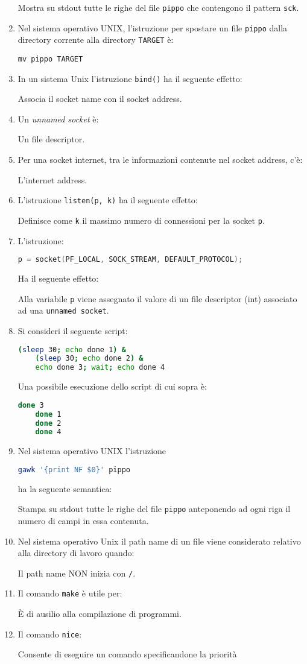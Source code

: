 \documentclass[a4paper,twoside]{article}
\newcommand{\code}[1]{\texttt{#1}}
\begin{document}
\begin{enumerate}
    Mostra su stdout tutte le righe del file \code{pippo} che contengono il pattern \code{sck}.
    \item Nel sistema operativo UNIX, l'istruzione per spostare un file \code{pippo} dalla directory corrente alla directory \code{TARGET} \`e:

    \code{mv pippo TARGET}
    \item In un sistema Unix l'istruzione \code{bind()} ha il seguente effetto:

    Associa il socket name con il socket address.
    \item Un \emph{unnamed socket} \`e:

    Un file descriptor.
    \item Per una socket internet, tra le informazioni contenute nel socket address, c'\`e:

    L'internet address.
    \item L'istruzione \code{listen(p, k)} ha il seguente effetto:

    Definisce come \code{k} il massimo numero di connessioni per la socket \code{p}.
    \item L'istruzione:
    \begin{lstlisting}[language=C]
    p = socket(PF_LOCAL, SOCK_STREAM, DEFAULT_PROTOCOL);
    \end{lstlisting}
    Ha il seguente effetto:

    Alla variabile \code{p} viene assegnato il valore di un file descriptor (int) associato ad una \code{unnamed socket}.
    \item Si consideri il seguente script:
    \begin{lstlisting}[language=sh]
    (sleep 30; echo done 1) &
    (sleep 30; echo done 2) &
    echo done 3; wait; echo done 4
    \end{lstlisting}
    Una possibile esecuzione dello script di cui sopra \`e:

    \begin{lstlisting}[language=sh]
    done 3
    done 1
    done 2
    done 4
    \end{lstlisting}
    \item Nel sistema operativo UNIX l'istruzione 
    \begin{lstlisting}[language=sh]
    gawk '{print NF $0}' pippo
    \end{lstlisting}
    ha la seguente semantica:

    Stampa su stdout tutte le righe del file \code{pippo} anteponendo ad ogni riga il numero di campi in essa contenuta.
    \item Nel sistema operativo Unix il path name di un file viene considerato relativo alla directory di lavoro quando:

    Il path name NON inizia con \code{/}.
    \item Il comando \code{make} \`e utile per:

    È di ausilio alla compilazione di programmi.
    \item Il comando \code{nice}:

    Consente di eseguire un comando specificandone la priorit\`a
\end{enumerate}
\end{document}
